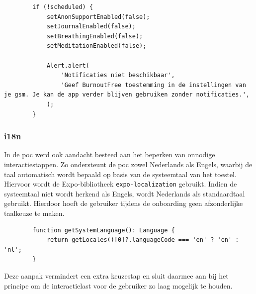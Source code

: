 \begin{listing}[H]
    \begin{verbatim}
        if (!scheduled) {
            setAnonSupportEnabled(false);
            setJournalEnabled(false);
            setBreathingEnabled(false);
            setMeditationEnabled(false);
            
            Alert.alert(
                'Notificaties niet beschikbaar',
                'Geef BurnoutFree toestemming in de instellingen van je gsm. Je kan de app verder blijven gebruiken zonder notificaties.',
            );
        }
    \end{verbatim}
    \caption[Uitschakelen van notificatie-instellingen bij fouten]
    {Uitschakelen van notificatie-instellingen en tonen van een duidelijke melding wanneer notificaties niet beschikbaar zijn.}
    \label{lst:melding-alert}
\end{listing}

\vspace{1em}

\subsubsection{i18n}
\label{sec:i18n-code}

\vspace{1em}

In de \acrshort{poc} werd ook aandacht besteed aan het beperken van onnodige interactiestappen. Zo ondersteunt de \acrshort{poc} zowel Nederlands als Engels, waarbij de taal automatisch wordt bepaald op basis van de systeemtaal van het toestel. Hiervoor wordt de Expo-bibliotheek \texttt{expo-localization} gebruikt. Indien de systeemtaal niet wordt herkend als Engels, wordt Nederlands als standaardtaal gebruikt. Hierdoor hoeft de gebruiker tijdens de onboarding geen afzonderlijke taalkeuze te maken.

\begin{listing}[H]
    \begin{verbatim}
        function getSystemLanguage(): Language {
            return getLocales()[0]?.languageCode === 'en' ? 'en' : 'nl';
        }
    \end{verbatim}
    \caption[Automatische selectie van de systeemtaal]
    {Automatische selectie van de applicatietaal op basis van de systeemtaal van het toestel.}
    \label{lst:i18n}
\end{listing}

Deze aanpak vermindert een extra keuzestap en sluit daarmee aan bij het principe om de interactielast voor de gebruiker zo laag mogelijk te houden.

